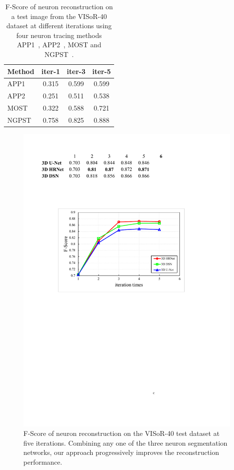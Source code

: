 \begin{table}[t]
	\centering
	\caption{F-Score of neuron reconstruction on a test image from the VISoR-40 dataset at different iterations using four neuron tracing methods APP1~\cite{Peng2011}, APP2~\cite{Xiao2013}, MOST\cite{Wu2014} and NGPST~\cite{Quan2015}.}
	\label{table:trace_iterations}
	\begin{tabular}{lccc}
		\toprule
		Method & iter-1 & iter-3 & iter-5\\
		\midrule
		APP1~\cite{Peng2011}
		& 0.315 & 0.599 & 0.599\\
		APP2~\cite{Xiao2013}
		& 0.251 & 0.511 & 0.538\\
		MOST~\cite{Wu2014}          
		& 0.322 & 0.588 & 0.721\\
		NGPST~\cite{Quan2015}
		& 0.758 & 0.825 & 0.888\\
		\bottomrule
	\end{tabular}
\end{table}

\begin{figure}[t]
	\centering
	\includegraphics[width=\columnwidth]{./Illustrations/trace_networks_fscore11.pdf}
	\caption{F-Score of neuron reconstruction on the VISoR-40 test dataset at five iterations. Combining any one of the three neuron segmentation networks, our approach progressively improves the reconstruction performance.}
	\label{fig:fscore_DNNs}
\end{figure}

